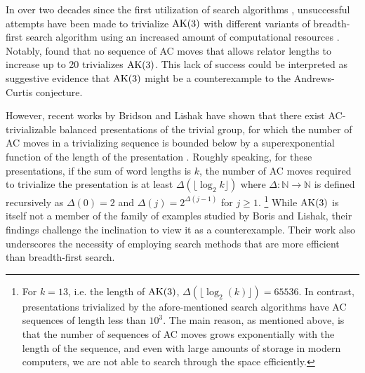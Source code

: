 In over two decades since the first utilization of search algorithms \cite{genetic, bfs-ac}, unsuccessful attempts have been made to trivialize $\text{AK}(3)$ with different variants of breadth-first search algorithm using an increased amount of computational resources \cite{Bowman-McCaul, krawiec2016distance, Panteleev-Ushakov}. Notably, \cite{Panteleev-Ushakov} found that no sequence of AC moves that allows relator lengths to increase up to 20 trivializes $\text{AK}(3)$. 
This lack of success could be interpreted as suggestive evidence that $\text{AK}(3)$ might be a counterexample to the Andrews-Curtis conjecture.
\newline 

However, recent works by Bridson and Lishak have shown that there exist AC-trivializable balanced presentations of the trivial group, for which the number of AC moves in a trivializing sequence is bounded below by a superexponential function of the length of the presentation \cite{Bridson, Lishak}.
Roughly speaking, for these presentations, if the sum of word lengths is $k$, the number of AC moves required to trivialize the presentation is at least $\Delta (\lfloor \log_2 k \rfloor)$ where $\Delta \colon \mathbb{N} \to \mathbb{N}$ is defined recursively as $\Delta(0) = 2$ and $\Delta (j) = 2^{\Delta(j-1)}$ for $j \geq 1$. 
\footnote{For $k=13$, i.e. the length of $\text{AK}(3)$, $\Delta (\lfloor \log_2 (k) \rfloor) = 65536$. In contrast, presentations trivialized by the afore-mentioned search algorithms have AC sequences of length less than $10^3$. The main reason, as mentioned above, is that the number of sequences of AC moves grows exponentially with the length of the sequence, and even with large amounts of storage in modern computers, we are not able to search through the space efficiently.}
While $\text{AK}(3)$ is itself not a member of the family of examples studied by Boris and Lishak, their findings challenge the inclination to view it as a counterexample. Their work also underscores the necessity of employing search methods that are more efficient than breadth-first search.
\newline


